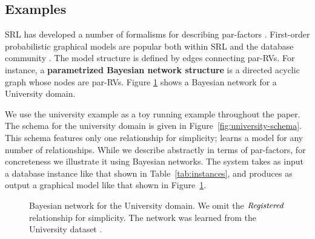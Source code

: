 \subsection{Examples} \label{sec:examples} SRL has developed a number of formalisms for describing par-factors \cite{Kimmig2015}. 
First-order probabilistic graphical models are popular both within SRL and the database community \cite{Kimmig2015,Wang2008}. The model structure is defined by edges connecting par-RVs. For instance, a \textbf{parametrized Bayesian network structure} is a directed acyclic graph whose nodes are par-RVs.  Figure \ref{fig:pbn} shows a Bayesian network for a University domain. 

We use the university example as a toy running example throughout the paper. The schema for the university domain is given in Figure~\ref{fig:university-schema}. This schema features only one relationship for simplicity; \FB learns a model for any number of relationships. While we describe \FB abstractly in terms of par-factors, for concreteness we illustrate it using Bayesian networks. The system takes as input a database instance like that shown in Table~\ref{tab:instances}, 
  and produces as output a graphical model like that shown in Figure~\ref{fig:pbn}.  




\begin{figure}[htbp] %
 \centering
{} 
\caption{Bayesian network for the University domain. 
We omit the $\it{Registered}$ relationship for simplicity. 
The network was learned from the University dataset \cite{bib:bbsite}.}
 \label{fig:pbn}
\end{figure}

